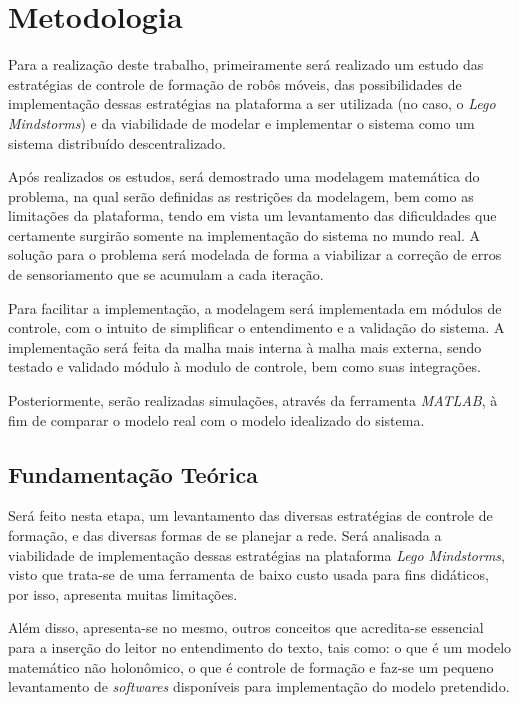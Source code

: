 %
%

\chapter{Metodologia}

Para a realização deste trabalho, primeiramente será realizado um estudo das estratégias de controle de formação de robôs móveis, das possibilidades %
de implementação dessas estratégias na plataforma a ser utilizada (no caso, o \emph{Lego Mindstorms\textregistered}) e da viabilidade de modelar e implementar o sistema como um sistema distribuído descentralizado. 

Após realizados os estudos, será demostrado uma modelagem matemática do problema, na qual serão definidas as restrições da modelagem, bem como as limitações da plataforma, tendo em vista um levantamento das dificuldades que certamente surgirão somente na implementação do sistema no mundo real. A solução para o problema será modelada de forma a viabilizar a correção de erros de sensoriamento que se acumulam a cada iteração.

Para facilitar a implementação, a modelagem será implementada em módulos de controle, com o intuito de simplificar o entendimento e a validação do sistema. A implementação será feita da malha mais interna à malha mais externa, sendo testado e validado módulo à modulo de controle, bem como suas integrações. 

Posteriormente, serão realizadas simulações, através da ferramenta \emph{MATLAB\textregistered}, à fim de comparar o modelo real com o modelo idealizado do sistema.

\section{Fundamentação Teórica}

Será feito nesta etapa, um levantamento das diversas estratégias de controle de formação, e das diversas formas de se planejar a rede. Será analisada a viabilidade de implementação dessas estratégias na plataforma \emph{Lego Mindstorms\textregistered}, visto que trata-se de uma ferramenta de baixo custo usada para fins didáticos, por isso, apresenta muitas limitações.

Além disso, apresenta-se no mesmo, outros conceitos que acredita-se essencial para a inserção do leitor no entendimento do texto, tais como: o que é um modelo matemático não holonômico, o que é controle de formação e faz-se um pequeno levantamento de \emph{softwares} disponíveis para implementação do modelo pretendido. 

